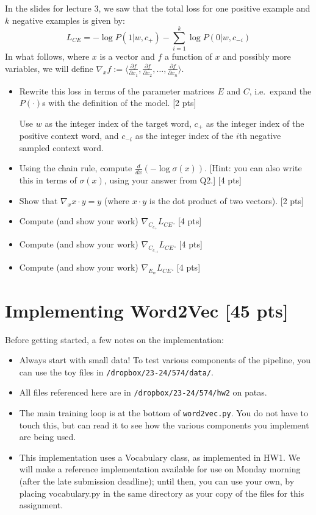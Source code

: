 \documentclass[11pt]{article}
\begin{document}
\vspace{2em}
  In the slides for lecture 3, we saw that the total loss for one positive example and $k$ negative examples is given by:
$$ L_{CE} = -\log P(1 | w, c_+) - \sum_{i=1}^k \log P(0 | w, c_{-i})$$
In what follows, where $x$ is a vector and $f$ a function of $x$ and possibly more variables, we will define $\nabla_x f := \langle \frac{\partial f}{\partial x_1} , \frac{\partial f}{\partial x_2}, \dots , \frac{\partial f}{\partial x_n} \rangle$.
\begin{itemize}
  \item Rewrite this loss in terms of the parameter matrices $E$ and $C$, i.e.\ expand the $P(\cdot)$s with the definition of the model. [2 pts]

        Use $w$ as the integer index of the target word, $c_+$ as the integer index of the positive context word, and $c_{-i}$ as the integer index of the $i$th negative sampled context word.
  \item Using the chain rule, compute $\frac{d}{dx}\left(-\log\sigma(x)\right)$.  [Hint: you can also write this in terms of $\sigma(x)$, using your answer from Q2.] [4 pts]
  \item Show that $\nabla_x x \cdot y = y$ (where $x \cdot y$ is the dot product of two vectors). [2 pts]
  \item Compute (and show your work) $\nabla_{C_{c_+}} L_{CE}$. [4 pts]
  \item Compute (and show your work) $\nabla_{C_{c_{-i}}} L_{CE}$. [4 pts]
  \item Compute (and show your work) $\nabla_{E_w} L_{CE}$. [4 pts]
\end{itemize}


\section{Implementing Word2Vec [45 pts]}

Before getting started, a few notes on the implementation:
\begin{itemize}
  \item Always start with small data!  To test various components of the pipeline, you can use the toy files in \texttt{/dropbox/23-24/574/data/}.
  \item All files referenced here are in \texttt{/dropbox/23-24/574/hw2} on patas.
  \item The main training loop is at the bottom of \texttt{word2vec.py}.  You do not have to touch this, but can read it to see how the various components you implement are being used.
  \item This implementation uses a Vocabulary class, as implemented in HW1.  We will make a reference implementation available for use on Monday morning (after the late submission deadline); until then, you can use your own, by placing vocabulary.py in the same directory as your copy of the files for this assignment.
\end{itemize}
\end{document}
